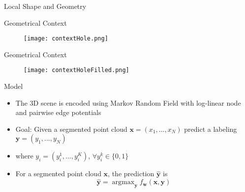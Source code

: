 \documentclass{beamer}
\DeclareMathOperator*{\argmax}{argmax}
\newcommand{\x}{{\mathbf x}}     %
\newcommand{\xs}[1]{{x_{#1}}}    %
\newcommand{\y}{{\mathbf y}}     %
\newcommand{\ys}[1]{{y_{#1}}}    %
\newcommand{\ysc}[2]{{y_{#1}^{#2}}}    %
\newcommand{\w}{{\mathbf w}}           %
\newcommand{\df}[3]{{f_{#3}(#1,#2)}}   %
\begin{document}


\begin{frame}{Local Shape and Geometry}
\end{frame}

\begin{frame}{Geometrical Context}
\begin{figure}[t!]
\texttt{[image: contextHole.png]}
\end{figure}
\end{frame}


\begin{frame}{Geometrical Context}
\begin{figure}[t!]
\texttt{[image: contextHoleFilled.png]}
\end{figure}
\end{frame}



\begin{frame}{Model}
\begin{itemize}

 \item The 3D scene is encoded using Markov Random Field with log-linear node and pairwise edge potentials
 
 
\item Goal: Given a segmented point cloud $\x=(\xs{1},...,\xs{N})$  predict a labeling $\y=(\ys{1},...,\ys{N})$

\item where $\ys{i}=(\ysc{i}{1},...,\ysc{i}{K})$,  $ \forall \ysc{i}{k} \in \{0,1\}$ 


\item For a segmented point cloud $\x$, the prediction $\hat{\y}$ is 
\begin{equation} \label{eq:argmax}
\hat{\y} = \argmax_\y \df{\x}{\y}{\w}
\end{equation}

\end{itemize}
\end{frame}
\end{document}
